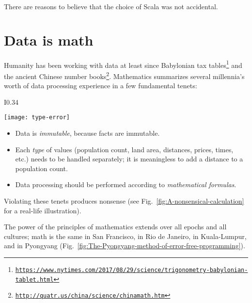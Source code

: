 There are reasons to believe that the choice of Scala was not accidental.

\section{Data is math}

Humanity has been working with data at least since Babylonian tax
tables\footnote{\texttt{\href{https://www.nytimes.com/2017/08/29/science/trigonometry-babylonian-tablet.html}{https://www.nytimes.com/2017/08/29/science/trigonometry-babylonian-tablet.html}}}
and the ancient Chinese number books\footnote{\texttt{\href{http://quatr.us/china/science/chinamath.htm}{http://quatr.us/china/science/chinamath.htm}}}.
Mathematics summarizes several millennia\textsf{'}s worth of data processing
experience in a few fundamental tenets:

\begin{wrapfigure}{I}{0.34\columnwidth}%
\begin{centering}
\vspace{-0.65\baselineskip}
\texttt{[image: type-error]}\vspace{-0.5\baselineskip}
\par\end{centering}
\caption{Mixing incompatible data types produces nonsensical results.\label{fig:A-nonsensical-calculation}}

\vspace{-3.5\baselineskip}
\end{wrapfigure}%

\begin{itemize}
\item Data is \emph{immutable}, because facts are immutable. 
\item Each \emph{type} of values (population count, land area, distances,
prices, times, etc.) needs to be handled separately; it is meaningless
to add a distance to a population count.
\item Data processing should be performed according to \emph{mathematical
formulas}. 
\end{itemize}
Violating these tenets produces nonsense (see Fig.\ \ref{fig:A-nonsensical-calculation}
for a real-life illustration).

The power of the principles of mathematics extends over all epochs
and all cultures; math is the same in San Francisco, in Rio de Janeiro,
in Kuala-Lumpur, and in Pyongyang (Fig.\ \ref{fig:The-Pyongyang-method-of-error-free-programming}).

